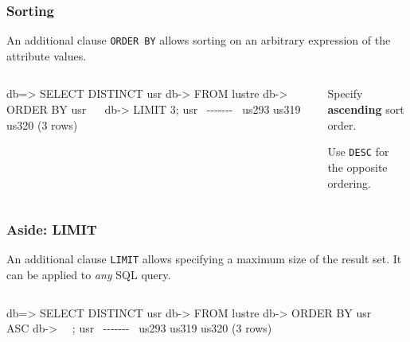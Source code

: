 \documentclass[english,serif,mathserif]{beamer}
\begin{document}
\begin{frame}[fragile]
  \frametitle{Sorting}
  An additional clause \texttt{ORDER BY} allows sorting on an arbitrary
  expression of the attribute values.

  \+
  \begin{columns}
    \begin{column}{0.5\linewidth}
\begin{sql}
db=> SELECT DISTINCT usr
db-> FROM lustre
db-> ORDER BY usr ~~
db-> LIMIT 3;
  usr
~-{}-{}-{}-{}-{}-{}-{}~
 us293
 us319
 us320
(3 rows)
\end{sql}
    \end{column}
    \begin{column}{0.5\linewidth}
      Specify \textbf{ascending} sort order.

      \+ Use \texttt{DESC} for the opposite ordering.
    \end{column}
  \end{columns}
\end{frame}


\begin{frame}[fragile]
  \frametitle{Aside: LIMIT}
  An additional clause \texttt{LIMIT} allows specifying a maximum size
  of the result set.  It can be applied to \emph{any} SQL query.

  \+
  \begin{columns}
    \begin{column}{0.5\linewidth}
\begin{sql}
db=> SELECT DISTINCT usr
db-> FROM lustre
db-> ORDER BY usr ASC
db-> ~~;
  usr
~-{}-{}-{}-{}-{}-{}-{}~
 us293
 us319
 us320
(3 rows)
\end{sql}
    \end{column}
    \begin{column}{0.5\linewidth}

    \end{column}
  \end{columns}
\end{frame}



\end{document}
